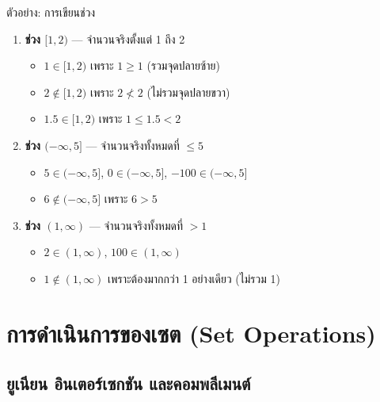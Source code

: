 \documentclass[11pt, aspectratio=169]{beamer}
\begin{document}
\begin{frame}{ตัวอย่าง: การเขียนช่วง}
  \begin{exambox}
    \begin{enumerate}
      \item \textbf{ช่วง $[1, 2)$} — จำนวนจริงตั้งแต่ 1 ถึง 2
        \begin{itemize}
          \item $1 \in [1, 2)$ เพราะ $1 \geq 1$ (รวมจุดปลายซ้าย)
          \item $2 \notin [1, 2)$ เพราะ $2 \not< 2$ (ไม่รวมจุดปลายขวา)
          \item $1.5 \in [1, 2)$ เพราะ $1 \leq 1.5 < 2$
        \end{itemize}

      \item \textbf{ช่วง $(-\infty, 5]$} — จำนวนจริงทั้งหมดที่ $\leq 5$
        \begin{itemize}
          \item $5 \in (-\infty, 5]$, \quad $0 \in (-\infty, 5]$, \quad $-100 \in (-\infty, 5]$
          \item $6 \notin (-\infty, 5]$ เพราะ $6 > 5$
        \end{itemize}

      \item \textbf{ช่วง $(1, \infty)$} — จำนวนจริงทั้งหมดที่ $> 1$
        \begin{itemize}
          \item $2 \in (1, \infty)$, \quad $100 \in (1, \infty)$
          \item $1 \notin (1, \infty)$ เพราะต้องมากกว่า 1 อย่างเดียว (ไม่รวม 1)
        \end{itemize}
    \end{enumerate}
  \end{exambox}
\end{frame}

\section{การดำเนินการของเซต (Set Operations)}

\subsection{ยูเนียน อินเตอร์เซกชัน และคอมพลีเมนต์}
\end{document}
